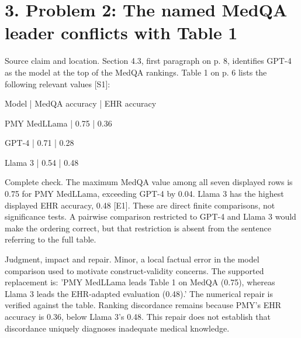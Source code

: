 \documentclass[10pt]{article}
\begin{document}
\section*{3. Problem 2: The named MedQA leader conflicts with Table 1}
Source claim and location. Section 4.3, first paragraph on p. 8, identifies GPT-4 as the model at the top of the MedQA rankings. Table 1 on p. 6 lists the following relevant values [S1]:\par
Model | MedQA accuracy | EHR accuracy\par
PMY MedLLama | 0.75 | 0.36\par
GPT-4 | 0.71 | 0.28\par
Llama 3 | 0.54 | 0.48\par
Complete check. The maximum MedQA value among all seven displayed rows is 0.75 for PMY MedLLama, exceeding GPT-4 by 0.04. Llama 3 has the highest displayed EHR accuracy, 0.48 [E1]. These are direct finite comparisons, not significance tests. A pairwise comparison restricted to GPT-4 and Llama 3 would make the ordering correct, but that restriction is absent from the sentence referring to the full table.\par
Judgment, impact and repair. Minor, a local factual error in the model comparison used to motivate construct-validity concerns. The supported replacement is: ’PMY MedLLama leads Table 1 on MedQA (0.75), whereas Llama 3 leads the EHR-adapted evaluation (0.48).’ The numerical repair is verified against the table. Ranking discordance remains because PMY’s EHR accuracy is 0.36, below Llama 3’s 0.48. This repair does not establish that discordance uniquely diagnoses inadequate medical knowledge.\par
\end{document}
